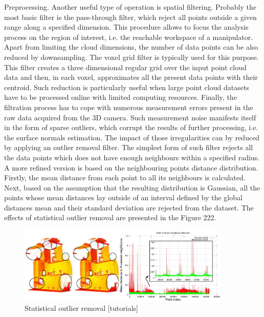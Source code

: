 
Preprocessing. Another useful type of operation is spatial filtering. Probably the most basic filter is the pass-through filter, which reject all points outside a given range along a specified dimension. This procedure allows to focus the analysis process on the region of interest, i.e. the reachable workspace of a manipulator. Apart from limiting the cloud dimensions, the number of data points can be also reduced by downsampling. The voxel grid filter is typically used for this purpose. This filter creates a three dimensional regular grid over the input point cloud data and then, in each voxel, approximates all the present data points with their centroid. Such reduction is particularly useful when large point cloud datasets have to be processed online with limited computing resources. Finally, the filtration process has to cope with numerous measurement errors present in the raw data acquired from the 3D camera. Such measurement noise 
manifests itself in the form of sparse outliers, which corrupt the results of further processing, i.e. the surface normals estimation. The impact of those irregularities can by reduced by applying an outlier removal filter. The simplest form of such filter rejects all the data points which does not have enough neighbours within a specified radius. A more refined version is based on the neighbouring points distance distribution. Firstly, the mean distance from each point to all its neighbours is calculated. Next, based on the assumption that the resulting distribution is Gaussian, all the points whose mean distances lay outside of an interval defined by the global distances mean and their standard deviation are rejected from the dataset. The effects of statistical outlier removal are presented in the Figure 222.


\begin{figure}[H]
\label{fig:outlierremoval}
\centering
\includegraphics[width=0.9\textwidth]{fig/statistical_removal}
\caption{Statistical outlier removal [tutorials]}
\end{figure}

